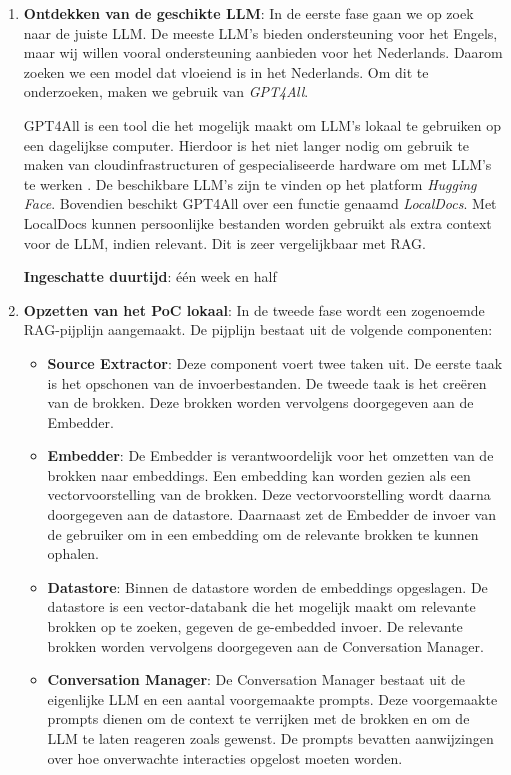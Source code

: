 \begin{enumerate}
    \item \textbf{Ontdekken van de geschikte LLM}: In de eerste fase gaan we op zoek naar de juiste LLM. De meeste LLM's bieden ondersteuning voor het Engels, maar wij willen vooral ondersteuning aanbieden voor het Nederlands. Daarom zoeken we een model dat vloeiend is in het Nederlands. Om dit te onderzoeken, maken we gebruik van \textit{GPT4All}.
    
    GPT4All is een tool die het mogelijk maakt om LLM's lokaal te gebruiken op een dagelijkse computer. Hierdoor is het niet langer nodig om gebruik te maken van cloudinfrastructuren of gespecialiseerde hardware om met LLM's te werken \autocite{NST2024}. De beschikbare LLM's zijn te vinden op het platform \textit{Hugging Face}. Bovendien beschikt GPT4All over een functie genaamd \textit{LocalDocs}. Met LocalDocs kunnen persoonlijke bestanden worden gebruikt als extra context voor de LLM, indien relevant. Dit is zeer vergelijkbaar met RAG.
    
    \textbf{Ingeschatte duurtijd}: één week en half
    
    \item \textbf{Opzetten van het PoC lokaal}: In de tweede fase wordt een zogenoemde RAG-pijplijn aangemaakt. De pijplijn bestaat uit de volgende componenten: 
    \begin{itemize} 
        \item \textbf{Source Extractor}: Deze component voert twee taken uit. De eerste taak is het opschonen van de invoerbestanden. De tweede taak is het creëren van de brokken. Deze brokken worden vervolgens doorgegeven aan de Embedder. 
        \item \textbf{Embedder}: De Embedder is verantwoordelijk voor het omzetten van de brokken naar embeddings. Een embedding kan worden gezien als een vectorvoorstelling van de brokken. Deze vectorvoorstelling wordt daarna doorgegeven aan de datastore. Daarnaast zet de Embedder de invoer van de gebruiker om in een embedding om de relevante brokken te kunnen ophalen. 
        \item \textbf{Datastore}: Binnen de datastore worden de embeddings opgeslagen. De datastore is een vector-databank die het mogelijk maakt om relevante brokken op te zoeken, gegeven de ge-embedded invoer. De relevante brokken worden vervolgens doorgegeven aan de Conversation Manager. 
        \item \textbf{Conversation Manager}: De Conversation Manager bestaat uit de eigenlijke LLM en een aantal voorgemaakte prompts. Deze voorgemaakte prompts dienen om de context te verrijken met de brokken en om de LLM te laten reageren zoals gewenst. De prompts bevatten aanwijzingen over hoe onverwachte interacties opgelost moeten worden.
     \end{itemize}
     

\end{enumerate}
